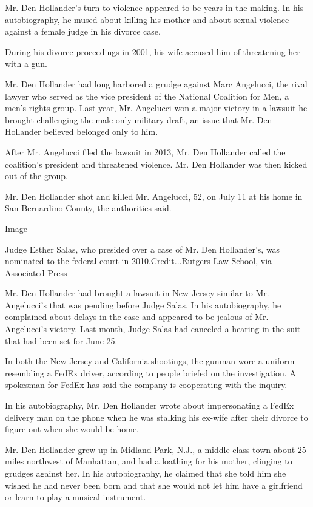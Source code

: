 Mr. Den Hollander's turn to violence appeared to be years in the making.
In his autobiography, he mused about killing his mother and about sexual
violence against a female judge in his divorce case.

During his divorce proceedings in 2001, his wife accused him of
threatening her with a gun.

Mr. Den Hollander had long harbored a grudge against Marc Angelucci, the
rival lawyer who served as the vice president of the National Coalition
for Men, a men's rights group. Last year, Mr. Angelucci
\href{https://www.nytimes3xbfgragh.onion/2019/02/24/us/military-draft-men-unconstitutional.html}{won
a major victory in a lawsuit he brought} challenging the male-only
military draft, an issue that Mr. Den Hollander believed belonged only
to him.

After Mr. Angelucci filed the lawsuit in 2013, Mr. Den Hollander called
the coalition's president and threatened violence. Mr. Den Hollander was
then kicked out of the group.

Mr. Den Hollander shot and killed Mr. Angelucci, 52, on July 11 at his
home in San Bernardino County, the authorities said.

Image

Judge Esther Salas, who presided over a case of Mr. Den Hollander's, was
nominated to the federal court in 2010.Credit...Rutgers Law School, via
Associated Press

Mr. Den Hollander had brought a lawsuit in New Jersey similar to Mr.
Angelucci's that was pending before Judge Salas. In his autobiography,
he complained about delays in the case and appeared to be jealous of Mr.
Angelucci's victory. Last month, Judge Salas had canceled a hearing in
the suit that had been set for June 25.

In both the New Jersey and California shootings, the gunman wore a
uniform resembling a FedEx driver, according to people briefed on the
investigation. A spokesman for FedEx has said the company is cooperating
with the inquiry.

In his autobiography, Mr. Den Hollander wrote about impersonating a
FedEx delivery man on the phone when he was stalking his ex-wife after
their divorce to figure out when she would be home.

Mr. Den Hollander grew up in Midland Park, N.J., a middle-class town
about 25 miles northwest of Manhattan, and had a loathing for his
mother, clinging to grudges against her. In his autobiography, he
claimed that she told him she wished he had never been born and that she
would not let him have a girlfriend or learn to play a musical
instrument.

